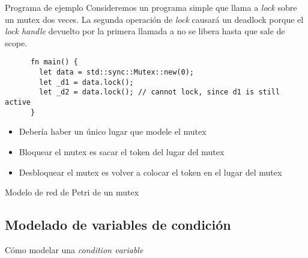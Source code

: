 \documentclass{beamer}
\begin{document}
\begin{frame}[fragile]{Programa de ejemplo}
  Consideremos un programa simple que llama a \emph{lock} sobre un mutex dos veces.
  La segunda operación de \emph{lock} causará un deadlock
  porque el \emph{lock handle} devuelto por la primera llamada a 
  no se libera hasta que sale de scope.

  \vfill

  \begin{listing}
    \begin{verbatim}
      fn main() {
        let data = std::sync::Mutex::new(0);
        let _d1 = data.lock();
        let _d2 = data.lock(); // cannot lock, since d1 is still active
      }
    \end{verbatim}
  \end{listing}

  \vfill

  \begin{itemize}
    \item Debería haber un único lugar que modele el mutex
    \item Bloquear el mutex es sacar el token del lugar del mutex
    \item Desbloquear el mutex es volver a colocar el token en el lugar del mutex
  \end{itemize}
\end{frame}

\begin{frame}{Modelo de red de Petri de un mutex}
  \begin{figure}
    \centering
    
  \end{figure}
\end{frame}

\subsection{Modelado de variables de condición}

\begin{frame}{Cómo modelar una \emph{condition variable}}
  \begin{figure}
    \centering
    
  \end{figure}
\end{frame}
\end{document}
